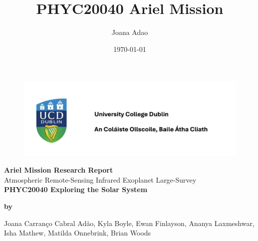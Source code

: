 \documentclass[12pt]{article}
\title{PHYC20040 Ariel Mission}
\author{Joana Adao}
\date{\today}
\begin{document}
\begin{titlepage}
    \begin{figure}[H]
        \includegraphics[width=.8\textwidth]{UCDLogo.png}
    \end{figure}

    \begin{center}
        \vspace{4cm}

        {\LARGE \bfseries Ariel Mission Research Report}\\
        \vspace{0.5cm}
        {\Large Atmospheric Remote-Sensing Infrared Exoplanet Large-Survey}\\
        \vspace{2cm}
        {\Large \textbf{PHYC20040 Exploring the Solar System}}\\
        
        \vspace{1cm}
    

    \vspace{2cm}
    
    {\large \textbf{by}}\\
    \vspace{.5cm}
    \begin{minipage}{.8\textwidth}
        \centering
        \normalsize{Joana Carranço Cabral Adão, Kyla Boyle, Ewan Finlayson, Ananya Laxmeshwar, Isha Mathew, Matilda Onnebrink, Brian Woods}
    \end{minipage}

    \end{center}
    
   \clearpage

\end{titlepage}

\tableofcontents
\thispagestyle{empty}

\newpage


\thispagestyle{empty}
\end{document}
